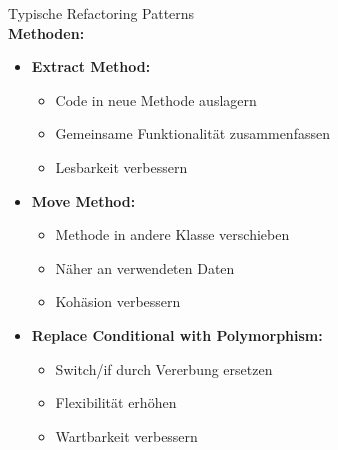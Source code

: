 \begin{KR}{Typische Refactoring Patterns}\\
\textbf{Methoden:}
\begin{itemize}
    \item \textbf{Extract Method:}
    \begin{itemize}
        \item Code in neue Methode auslagern
        \item Gemeinsame Funktionalität zusammenfassen
        \item Lesbarkeit verbessern
    \end{itemize}
    
    \item \textbf{Move Method:}
    \begin{itemize}
        \item Methode in andere Klasse verschieben
        \item Näher an verwendeten Daten
        \item Kohäsion verbessern
    \end{itemize}
    
    \item \textbf{Replace Conditional with Polymorphism:}
    \begin{itemize}
        \item Switch/if durch Vererbung ersetzen
        \item Flexibilität erhöhen
        \item Wartbarkeit verbessern
    \end{itemize}
\end{itemize}
\end{KR}

